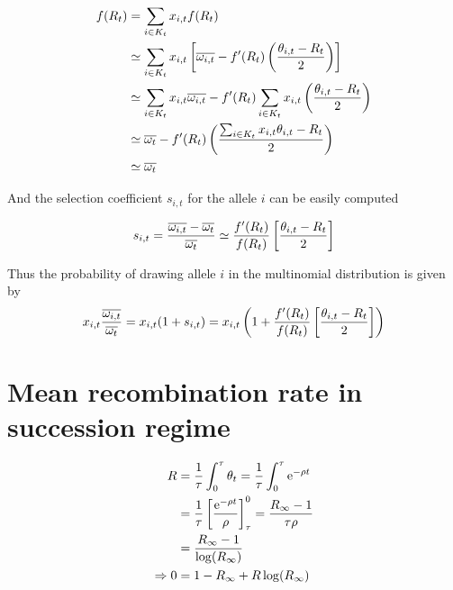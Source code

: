 \documentclass{article}
\begin{document}
\begin{align}
    f(R_{t} ) &= \sum_{i \in K_{t}} x_{i,t} f(R_{t} ) \\
    &\simeq \sum_{i \in K_{t}} x_{i,t} \left[ \overline{\omega_{i,t}} - f'(R_{t} ) \left( \dfrac{\theta _{i,t} - R_{t} }{2}\right) \right] \\
    &\simeq
    \sum_{i \in K_{t}} x_{i,t} \overline{\omega_{i,t}} - f'(R_{t} ) \sum_{i \in K_{t}} x_{i,t}  \left( \dfrac{\theta _{i,t} - R_{t} }{2}\right) \\
    &\simeq
     \overline{\omega_{t}} - f'(R_{t} )  \left( \dfrac{\sum_{i \in K_{t}} x_{i,t} \theta _{i,t} - R_{t} }{2}\right) \\
    &\simeq
     \overline{\omega_{t}}
\end{align}

And the selection coefficient $s_{i,t}$ for the allele $i$ can be easily computed

\begin{equation}
    s_{i,t} = \dfrac{\overline{\omega_{i,t}} - \overline{\omega_{t}}}{\overline{\omega_{t}}}
    \simeq  \dfrac{f'(R_{t} )}{f(R_{t} )} \left[ \dfrac{\theta _{i,t} - R_{t} }{2} \right]
\end{equation}

Thus the probability of drawing allele $i$ in the multinomial distribution is given by 
\begin{equation}
    x_{i,t} \dfrac{\overline{\omega_{i,t}}}{\overline{\omega_{t}}} = 
     x_{i,t} (1 + s_{i,t}) =  x_{i,t} \left(1 +  \dfrac{f'(R_{t} )}{f(R_{t} )} \left[ \dfrac{\theta _{i,t} - R_{t} }{2} \right] \right)
\end{equation}

\section*{Mean recombination rate in succession regime}

\begin{align} 
    R &=  \dfrac{1}{\tau}\int_0^{\tau} \theta_{t} 
        	 = \dfrac{1}{\tau}\int_0^{\tau} \operatorname{e}^{-\rho t} \\
        	 &= \dfrac{1}{\tau} \left[  \dfrac{\operatorname{e}^{-\rho t}}{\rho }  \right]_{\tau}^{0}
        	 = \dfrac{{R_{\infty}} - 1}{\tau \rho}\\
        	 &= \dfrac{{R_{\infty}} - 1}{\operatorname{log}({R_{\infty}} )} \\
    \Rightarrow 0 &=  1-{R_{\infty}}  + R  \operatorname{log}({R_{\infty}} ) 
\end{align}
\end{document}
